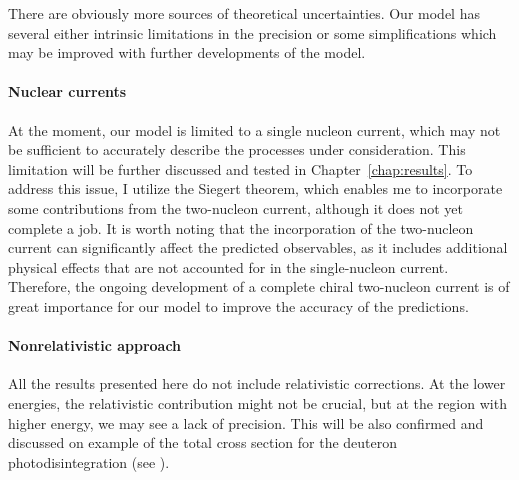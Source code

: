     There are obviously more sources of theoretical uncertainties. 
    Our model has several either intrinsic limitations in the precision or 
    some simplifications which may be improved with further developments of the model.
    
    \paragraph{Nuclear currents}
    At the moment, our model is limited to a single nucleon current, which may not be sufficient to accurately describe the processes under consideration.  This limitation will be further discussed and tested in
    Chapter~\ref{chap:results}. To address this issue, I utilize the Siegert theorem, which enables me to
    incorporate some contributions from the two-nucleon current, although it does not yet complete a job.
    It is worth noting
    that the incorporation of the two-nucleon current can significantly affect the predicted observables, as it
    includes additional physical effects that are not accounted for in the single-nucleon current. Therefore, the
    ongoing development of a complete chiral two-nucleon current
    is of great importance for our model to improve the accuracy of the predictions.

    \paragraph{Nonrelativistic approach}
    All the results presented here do not include relativistic corrections.
    At the lower energies, the relativistic contribution might not be crucial,
    but at the region with higher energy, we may see a lack of precision.
    This will be also confirmed and discussed on example of the total cross section
    for the deuteron photodisintegration (see ).
    
